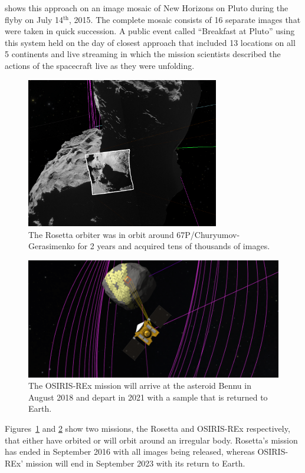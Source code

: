  shows this approach on an image mosaic of New Horizons on Pluto during the flyby on July 14$^{\textrm{th}}$, 2015.  The complete mosaic consists of 16 separate images that were taken in quick succession.  A public event called ``Breakfast at Pluto'' using this system held on the day of closest approach that included 13 locations on all 5 continents and live streaming in which the mission scientists described the actions of the spacecraft live as they were unfolding.

\begin{figure}
\centering
\includegraphics[width=0.75\textwidth]{figures/contributions/sc/rosetta.jpg}
\caption{The Rosetta orbiter was in orbit around 67P/Churyumov-Gerasimenko for 2 years and acquired tens of thousands of images.}
\label{contributions:astro:sc:rosetta}
\end{figure}

\begin{figure}
\centering
\includegraphics[width=\textwidth]{figures/contributions/sc/osiris_rex.png}
\caption{The OSIRIS-REx mission will arrive at the asteroid Bennu in August 2018 and depart in 2021 with a sample that is returned to Earth.}
\label{contributions:astro:sc:osirisrex}
\end{figure}

Figures~\ref{contributions:astro:sc:rosetta} and \ref{contributions:astro:sc:osirisrex} show two missions, the Rosetta and OSIRIS-REx respectively, that either have orbited or will orbit around an irregular body.  Rosetta's mission has ended in September 2016 with all images being released, whereas OSIRIS-REx' mission will end in September 2023 with its return to Earth.
